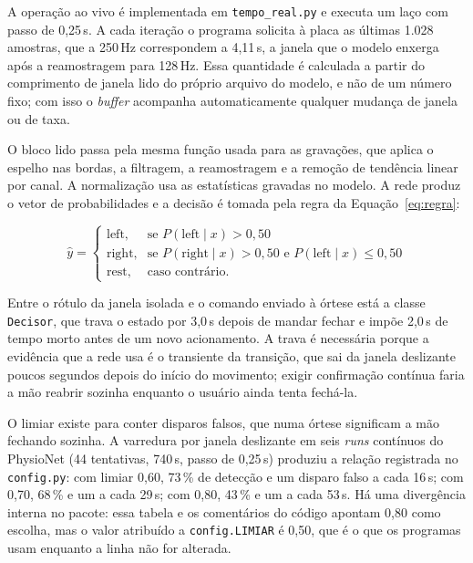 \documentclass[12pt,a4paper]{article}
\begin{document}
A operação ao vivo é implementada em \texttt{tempo\_real.py} e executa um laço com passo de
0,25\,s. A cada iteração o programa solicita à placa as últimas 1.028 amostras, que a 250\,Hz
correspondem a 4,11\,s, a janela que o modelo enxerga após a reamostragem para
128\,Hz. Essa quantidade é calculada a partir do comprimento de janela lido do próprio arquivo
do modelo, e não de um número fixo; com isso o \textit{buffer} acompanha automaticamente
qualquer mudança de janela ou de taxa.

O bloco lido passa pela mesma função usada para as gravações, que aplica o espelho nas bordas,
a filtragem, a reamostragem e a remoção de tendência linear por canal. A normalização usa as
estatísticas gravadas no modelo. A rede produz o vetor de probabilidades e a decisão é tomada
pela regra da Equação~\ref{eq:regra}:

\begin{equation}\label{eq:regra}
\hat{y} =
\begin{cases}
\text{left}, & \text{se } P(\text{left} \mid x) > 0{,}50 \\[2pt]
\text{right}, & \text{se } P(\text{right} \mid x) > 0{,}50 \text{ e } P(\text{left} \mid x) \leq 0{,}50 \\[2pt]
\text{rest}, & \text{caso contrário.}
\end{cases}
\end{equation}

Entre o rótulo da janela isolada e o comando enviado à órtese está a classe
\texttt{Decisor}, que trava o estado por 3,0\,s depois de mandar fechar e impõe 2,0\,s de tempo
morto antes de um novo acionamento. A trava é necessária porque a evidência que a rede usa é o
transiente da transição, que sai da janela deslizante poucos segundos depois do início do
movimento; exigir confirmação contínua faria a mão reabrir sozinha enquanto o usuário ainda
tenta fechá-la.

O limiar existe para conter disparos falsos, que numa órtese significam a mão fechando
sozinha. A varredura por
janela deslizante em seis \textit{runs} contínuos do PhysioNet (44 tentativas, 740\,s, passo de
0,25\,s) produziu a relação registrada no \texttt{config.py}: com limiar 0,60, 73\,\% de
detecção e um disparo falso a cada 16\,s; com 0,70, 68\,\% e um a cada 29\,s; com 0,80, 43\,\%
e um a cada 53\,s. Há uma divergência interna no pacote: essa tabela e os
comentários do código apontam 0,80 como escolha, mas o valor atribuído a
\texttt{config.LIMIAR} é 0,50, que é o que os programas usam enquanto a linha não for alterada.
\end{document}
